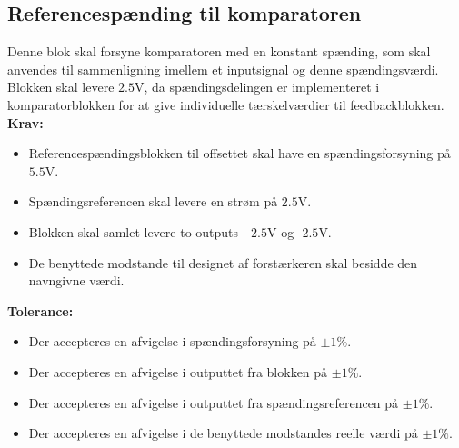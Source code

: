 \subsection{Referencespænding til komparatoren}\label{Ref_Kompar_Afs}
Denne blok skal forsyne komparatoren med en konstant spænding, som skal anvendes til sammenligning imellem et inputsignal og denne spændingsværdi.
Blokken skal levere $2.5$V, da spændingsdelingen er implementeret i komparatorblokken for at give individuelle tærskelværdier til feedbackblokken. \\ \textbf{Krav:}
\begin{itemize}
	\item Referencespændingsblokken til offsettet skal have en spændingsforsyning på $5.5$V.
	\item Spændingsreferencen skal levere en strøm på $2.5$V.
	\item Blokken skal samlet levere to outputs - $2.5$V og -$2.5$V.
	\item De benyttede modstande til designet af forstærkeren skal besidde den navngivne værdi.
\end{itemize}
\noindent \textbf{Tolerance:}
\begin{itemize}
	\item Der accepteres en afvigelse i spændingsforsyning på $\pm1\%$.
	\item Der accepteres en afvigelse i outputtet fra blokken på $\pm1\%$.
	\item Der accepteres en afvigelse i outputtet fra spændingsreferencen på $\pm1\%$. 
	\item Der accepteres en afvigelse i de benyttede modstandes reelle værdi på $\pm1\%$.
\end{itemize}
